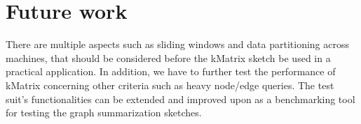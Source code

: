 \section{Future work}

There are multiple aspects such as sliding windows and data partitioning across machines, that should be considered before the kMatrix sketch be used in a practical application. In addition, we have to further test the performance of kMatrix concerning other criteria such as heavy node/edge queries. The test suit’s functionalities can be extended and improved upon as a benchmarking tool for testing the graph summarization sketches. 
